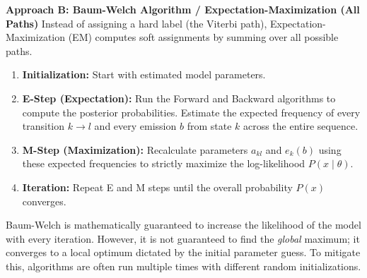 \textbf{Approach B: Baum-Welch Algorithm / Expectation-Maximization (All Paths)}
Instead of assigning a hard label (the Viterbi path), Expectation-Maximization (EM) computes soft assignments by summing over all possible paths.
\begin{enumerate}
    \item \textbf{Initialization:} Start with estimated model parameters.
    \item \textbf{E-Step (Expectation):} Run the Forward and Backward algorithms to compute the posterior probabilities. Estimate the expected frequency of every transition $k \rightarrow l$ and every emission $b$ from state $k$ across the entire sequence.
    \item \textbf{M-Step (Maximization):} Recalculate parameters $a_{kl}$ and $e_k(b)$ using these expected frequencies to strictly maximize the log-likelihood $P(x \mid \theta)$.
    \item \textbf{Iteration:} Repeat E and M steps until the overall probability $P(x)$ converges.
\end{enumerate}
\sta Baum-Welch is mathematically guaranteed to increase the likelihood of the model with every iteration. However, it is not guaranteed to find the \textit{global} maximum; it converges to a local optimum dictated by the initial parameter guess. To mitigate this, algorithms are often run multiple times with different random initializations.


